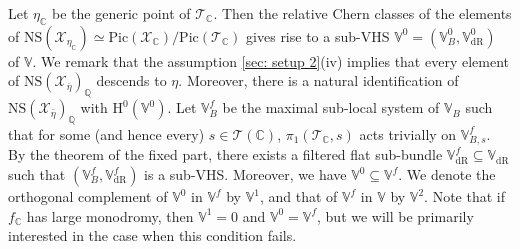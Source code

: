 \documentclass[letter, 11pt]{article}
\theoremstyle{plain}
\theoremstyle{definition}
\newcommand{\IC}{\mathbb{C}}
\newcommand{\IQ}{\mathbb{Q}}
\newcommand{\IV}{\mathbb{V}}
\newcommand{\<}{\langle}
\renewcommand{\>}{\rangle}
\newcommand{\sX}{\mathcal{X}}
\newcommand{\sS}{\mathcal{S}}
\newcommand{\sT}{\mathcal{T}}
\newcommand{\Pic}{\mathrm{Pic}}
\renewcommand{\H}{\mathrm{H}}
\newcommand{\dR}{\mathrm{dR}}
\newcommand{\NS}{\mathrm{NS}}
\begin{document}
Let $\eta_\IC$ be the generic point of $\sT_\IC$. Then the relative Chern classes of the elements of $\NS(\sX_{\eta_\IC}) \simeq \Pic(\sX_{\IC})/\Pic(\sT_\IC)$ gives rise to a sub-VHS $\IV^0 = (\IV^0_B, \IV^0_\dR)$ of $\IV$. We remark that the assumption \ref{sec: setup 2}(iv) implies that every element of $\NS(\sX_{\bar{\eta}})_\IQ$ descends to $\eta$. Moreover, there is a natural identification of $\NS(\sX_{\bar{\eta}})_\IQ$ with $\H^0(\IV^0)$. Let $\IV^f_B$ be the maximal sub-local system of $\IV_B$ such that for some (and hence every) $s \in \sT(\IC)$, $\pi_1(\sT_\IC, s)$ acts trivially on $\IV^f_{B, s}$. By the theorem of the fixed part, there exists a filtered flat sub-bundle $\IV^f_\dR \subseteq \IV_\dR$ such that $(\IV^f_B, \IV^f_\dR)$ is a sub-VHS. Moreover, we have $\IV^0 \subseteq \IV^f$. We denote the orthogonal complement of $\IV^0$ in $\IV^f$ by $\IV^1$, and that of $\IV^f$ in $\IV$ by $\IV^2$. Note that if $f_\IC$ has large monodromy, then $\IV^1 = 0$ and $\IV^0 = \IV^f$, but we will be primarily interested in the case when this condition fails. 


\end{document}
